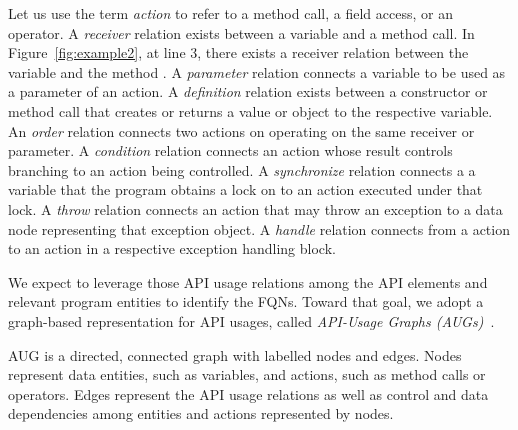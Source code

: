 Let us use the term {\em action} to refer to a method call, a field
access, or an operator. A {\em receiver} relation exists between a
variable and a method call. In Figure~\ref{fig:example2},
at line 3, there exists a receiver relation between the variable
 and the method . A {\em
  parameter} relation connects a variable to be used as a parameter of
an action. A {\em definition} relation exists between a constructor or
method call that creates or returns a value or object to the
respective variable. An {\em order} relation connects two actions on
operating on the same receiver or parameter. A {\em condition}
relation connects an action whose result controls branching to an
action being controlled. A {\em synchronize} relation connects a a
variable that the program obtains a lock on to an action executed
under that lock. A {\em throw} relation connects an action that may
throw an exception to a data node representing that exception
object. A {\em handle} relation connects from a  action to
an action in a respective exception handling block.

We expect to leverage those API usage relations among the API elements
and relevant program entities to identify the FQNs. Toward that goal,
we adopt a graph-based representation for API usages, called {\em
  API-Usage Graphs (AUGs)}~\cite{msr19}.

\begin{Definition}
AUG is a directed, connected graph with labelled nodes and
edges. Nodes represent data entities, such as variables, and actions,
such as method calls or operators. Edges represent the API usage
relations as well as control and data dependencies among entities and
actions represented by nodes.
\end{Definition}

